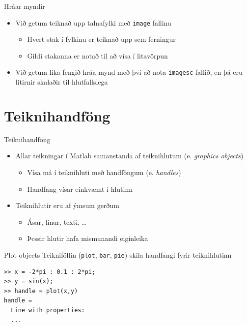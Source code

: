 \documentclass[handout]{beamer}
\begin{document}
\begin{frame}{Hráar myndir}
\begin{itemize}
 \item Við getum teiknað upp talnafylki með \texttt{image} fallinu
 \begin{itemize}
  \item Hvert stak í fylkinu er teiknað upp sem ferningur
  \item Gildi stakanna er notað til að vísa í litavörpun
 \end{itemize}
 \item Við getum líka fengið hráa mynd með því að nota \texttt{imagesc} fallið, en þá eru litirnir skalaðir til hlutfallslega
\end{itemize}

\end{frame}


\section{Teiknihandföng}

\begin{frame}{Teiknihandföng}
\begin{itemize}
 \item Allar teikningar í Matlab samanstanda af teiknihlutum (e. \emph{graphics objects})
 \begin{itemize}
  \item Vísa má í teiknihluti með handföngum (e. \emph{handles})
  \item Handfang vísar einkvæmt í hlutinn
 \end{itemize}
 \item Teiknihlutir eru af ýmsum gerðum
 \begin{itemize}
  \item Ásar, línur, texti, \ldots
  \item Þessir hlutir hafa mismunandi eiginleika
 \end{itemize}
\end{itemize}
\end{frame}

\begin{frame}[fragile]{Plot objects}
Teikniföllin (\texttt{plot}, \texttt{bar}, \texttt{pie}) skila handfangi fyrir teiknihlutinn
\begin{verbatim}
>> x = -2*pi : 0.1 : 2*pi;
>> y = sin(x);
>> handle = plot(x,y)
handle = 
  Line with properties:
  ...
\end{verbatim}
\end{frame}
\end{document}
